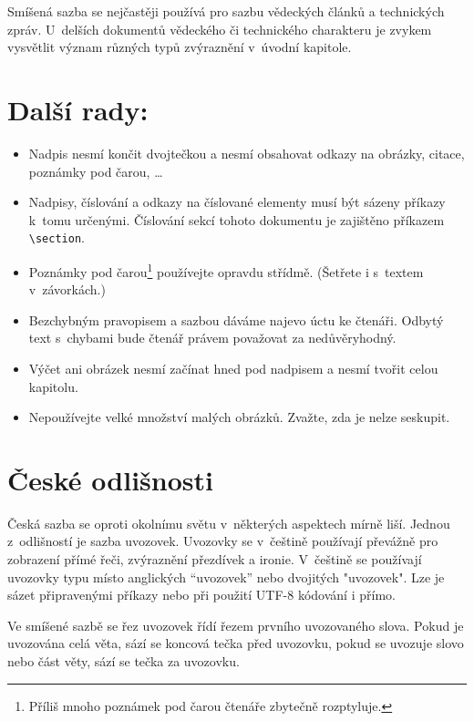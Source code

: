 \documentclass[a4paper, 10pt, twocolumn]{article}
\begin{document}
Smíšená sazba se nejčastěji používá pro sazbu vědeckých článků a technických zpráv.
U~delších dokumentů vědeckého či technického charakteru je zvykem vysvětlit význam různých typů zvýraznění v~úvodní kapitole.

\section{Další rady:}
\begin{itemize}
\item Nadpis nesmí končit dvojtečkou a nesmí obsahovat odkazy na obrázky, citace, poznámky pod čarou, \dots

\item Nadpisy, číslování a odkazy na číslované elementy musí být sázeny příkazy k~tomu určenými.
Číslování sekcí tohoto dokumentu je zajištěno příkazem \verb+\section+.

\item Poznámky pod čarou\footnote{Příliš mnoho poznámek pod čarou čtenáře zbytečně rozptyluje.} používejte opravdu střídmě.
(Šetřete i s~textem v~závorkách.)

\item Bezchybným pravopisem a sazbou dáváme najevo úctu ke čtenáři.
Odbytý text s~chybami bude čtenář právem považovat za nedůvěryhodný.

\item Výčet ani obrázek nesmí začínat hned pod nadpisem a nesmí tvořit celou kapitolu.

\item Nepoužívejte velké množství malých obrázků. Zvažte, zda je nelze seskupit.
\end{itemize}

\section{České odlišnosti}
Česká sazba se oproti okolnímu světu v~některých aspektech mírně liší.
Jednou z~odlišností je sazba uvozovek.
Uvozovky se v~češtině používají převážně pro zobrazení přímé řeči, zvýraznění přezdívek a ironie.
V~češtině se používají uvozovky typu  místo anglických “uvozovek” nebo dvojitých "uvozovek".
Lze je sázet připravenými příkazy nebo při použití UTF-8 kódování i přímo.

Ve smíšené sazbě se řez uvozovek řídí řezem prvního uvozovaného slova.
Pokud je uvozována celá věta, sází se koncová tečka před uvozovku, pokud se uvozuje slovo nebo část věty, sází se tečka za uvozovku.
\end{document}
